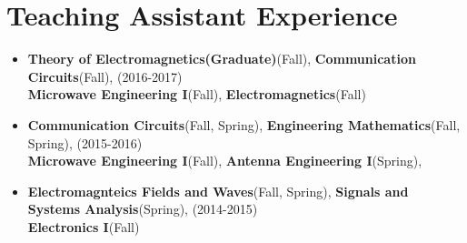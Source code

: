 \documentclass[a4paper,10pt]{article} %
\begin{document}
\section{Teaching Assistant Experience}
\color{Black}
	\begin{itemize}
	\item	\textbf{Theory of Electromagnetics(Graduate)}(Fall),
	 \textbf{Communication Circuits}(Fall), \hfill {(2016-2017)}\\
\textbf{Microwave Engineering I}(Fall), \textbf{Electromagnetics}(Fall)
	\item	\textbf{Communication Circuits}(Fall, Spring), \textbf{Engineering Mathematics}(Fall, Spring), 
	\hfill {(2015-2016)}\\
	 \textbf{Microwave Engineering I}(Fall), \textbf{Antenna Engineering I}(Spring),
	
		\item	\textbf{Electromagnteics Fields and Waves}(Fall, Spring), \textbf{Signals and Systems Analysis}(Spring),	\hfill {(2014-2015)}\\
		 \textbf{Electronics I}(Fall)
	
	
	\end{itemize}
	
\end{document}
